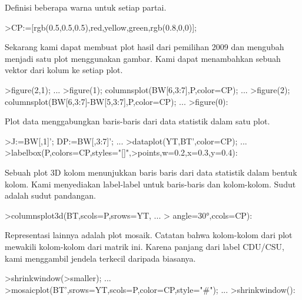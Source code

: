 \documentclass[a4paper,10pt]{article}
\begin{document}
\begin{eulernotebook}
\begin{eulercomment}
Definisi beberapa warna untuk setiap partai.
\end{eulercomment}
\begin{eulerprompt}
>CP:=[rgb(0.5,0.5,0.5),red,yellow,green,rgb(0.8,0,0)];
\end{eulerprompt}
\begin{eulercomment}
Sekarang kami dapat membuat plot hasil dari pemilihan 2009 dan mengubah menjadi satu plot
menggunakan gambar. Kami dapat menambahkan sebuah vektor dari kolum ke setiap plot.
\end{eulercomment}
\begin{eulerprompt}
>figure(2,1);  ...
>figure(1); columnsplot(BW[6,3:7],P,color=CP); ...
>figure(2); columnsplot(BW[6,3:7]-BW[5,3:7],P,color=CP);  ...
>figure(0):
\end{eulerprompt}
\begin{eulercomment}
Plot data menggabungkan baris-baris dari data statistik dalam satu plot.
\end{eulercomment}
\begin{eulerprompt}
>J:=BW[,1]'; DP:=BW[,3:7]'; ...
>dataplot(YT,BT',color=CP);  ...
>labelbox(P,colors=CP,styles="[]",>points,w=0.2,x=0.3,y=0.4):
\end{eulerprompt}
\begin{eulercomment}
Sebuah plot 3D kolom menunjukkan baris baris dari data statistik dalam bentuk kolom. Kami
menyediakan label-label untuk baris-baris dan kolom-kolom. Sudut adalah sudut pandangan.
\end{eulercomment}
\begin{eulerprompt}
>columnsplot3d(BT,scols=P,srows=YT, ...
>  angle=30°,ccols=CP):
\end{eulerprompt}
\begin{eulercomment}
Representasi lainnya adalah plot mosaik. Catatan bahwa kolom-kolom dari plot mewakili
kolom-kolom dari matrik ini. Karena panjang dari label CDU/CSU, kami menggambil jendela
terkecil daripada biasanya.
\end{eulercomment}
\begin{eulerprompt}
>shrinkwindow(>smaller);  ...
>mosaicplot(BT',srows=YT,scols=P,color=CP,style="#"); ...
>shrinkwindow():
\end{eulerprompt}

\end{eulernotebook}
\end{document}

